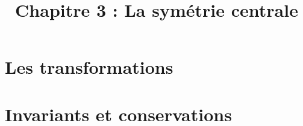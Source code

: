 \title{\vspace{-3em}Chapitre 3 : La symétrie centrale\vspace{-4em}}%
\date{ }
\maketitle


\section{Les transformations}



\section{Invariants et conservations}


